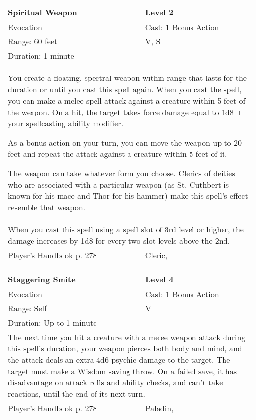 \documentclass[11pt]{report}
\begin{document}
\begin{table}[H]
	\begin{tabular}{||p{6cm}|p{6cm}||}
		\hline\hline
		\bf{Spiritual Weapon} & Level 2\\ \hline
		Evocation & Cast: 1 Bonus Action\\ \hline
		Range: 60 feet & V, S\\ \hline
		Duration: 1 minute & \\ \hline
		\multicolumn{2}{||p{12cm}||}{You create a floating, spectral weapon within range that lasts for the duration or until you cast this spell again.
When you cast the spell, you can make a melee spell attack against a creature within 5 feet of the weapon. On a hit, the target takes force damage equal to 1d8 + your spellcasting ability modifier.

As a bonus action on your turn, you can move the weapon up to 20 feet and repeat the attack against a creature within 5 feet of it.

The weapon can take whatever form you choose. Clerics of deities who are associated with a particular weapon (as St. Cuthbert is known for his mace and Thor for his hammer) make this spell’s effect resemble that weapon.}\\ \hline
		\multicolumn{2}{||p{12cm}||}{When you cast this spell using a spell slot of 3rd level or higher, the damage increases by 1d8 for every two slot levels above the 2nd.}\\ \hline
Player's Handbook p. 278 & Cleric, \\ \hline\hline
	\end{tabular}
\end{table}

\begin{table}[H]
	\begin{tabular}{||p{6cm}|p{6cm}||}
		\hline\hline
		\bf{Staggering Smite} & Level 4\\ \hline
		Evocation & Cast: 1 Bonus Action\\ \hline
		Range: Self & V\\ \hline
		Duration: Up to 1 minute & \\ \hline
		\multicolumn{2}{||p{12cm}||}{The next time you hit a creature with a melee weapon attack during this spell’s duration, your weapon pierces both body and mind, and the attack deals an extra 4d6 psychic damage to the target. The target must make a Wisdom saving throw. On a failed save, it has disadvantage on attack rolls and ability checks, and can’t take reactions, until the end of its next turn.}\\ \hline
Player's Handbook p. 278 & Paladin, \\ \hline\hline
	\end{tabular}
\end{table}
\end{document}
